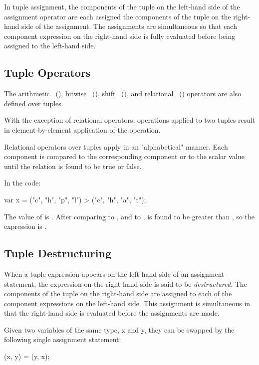 In tuple assignment, the components of the tuple on the left-hand
side of the assignment operator are each assigned the components of
the tuple on the right-hand side of the assignment.  The assignments
are simultaneous so that each component expression on the right-hand
side is fully evaluated before being assigned to the left-hand side.

\subsection{Tuple Operators}
\label{Tuple_Operators}

The arithmetic ~(), bitwise
~(), shift ~(), and
relational ~() operators are also defined
over tuples.

With the exception of relational operators, operations applied to two
tuples result in element-by-element application of the operation.

Relational operators over tuples apply in an "alphabetical" manner.
Each component is compared to the corresponding component or to the
scalar value until the relation is found to be true or false.

\begin{example}
In the code:
\begin{chapel}
var x = ("c", "h", "p", "l") > ("c", "h", "a", "t"); 
\end{chapel}
The value of  is . After comparing  to
, and  to ,  is found to be
greater than , so the expression is . 
\end{example}

\subsection{Tuple Destructuring}
\label{Tuple_Destructuring}

When a tuple expression appears on the left-hand side of an assignment
statement, the expression on the right-hand side is said to be {\em
destructured}.  The components of the tuple on the right-hand side are
assigned to each of the component expressions on the left-hand side.
This assignment is simultaneous in that the right-hand side is
evaluated before the assignments are made.
\begin{example}
Given two variables of the same type, x and y, they can be swapped by
the following single assignment statement:
\begin{chapel}
(x, y) = (y, x);
\end{chapel}
\end{example}


